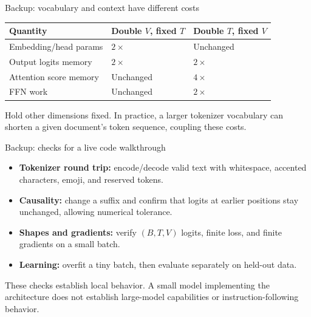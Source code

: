 \documentclass[11pt,aspectratio=169]{beamer}
\begin{document}
\begin{frame}{Backup: vocabulary and context have different costs}
\begin{tabular}{@{}>{\raggedright\arraybackslash}p{}>{\raggedright\arraybackslash}p{}>{\raggedright\arraybackslash}p{}@{}}
\toprule
Quantity & Double $V$, fixed $T$ & Double $T$, fixed $V$\\\midrule
Embedding/head params & $2\times$ & Unchanged\\[3mm]
Output logits memory & $2\times$ & $2\times$\\[3mm]
Attention score memory & Unchanged & $4\times$\\[3mm]
FFN work & Unchanged & $2\times$\\\bottomrule
\end{tabular}\par
\par\vspace{4mm}
Hold other dimensions fixed. In practice, a larger tokenizer vocabulary can shorten a given document's token sequence, coupling these costs.
\end{frame}

\begin{frame}{Backup: checks for a live code walkthrough}
\begin{itemize}
\item \textbf{Tokenizer round trip:} encode/decode valid text with whitespace, accented characters, emoji, and reserved tokens.
\item \textbf{Causality:} change a suffix and confirm that logits at earlier positions stay unchanged, allowing numerical tolerance.
\item \textbf{Shapes and gradients:} verify $(B,T,V)$ logits, finite loss, and finite gradients on a small batch.
\item \textbf{Learning:} overfit a tiny batch, then evaluate separately on held-out data.
\end{itemize}
\par\vspace{4mm}
These checks establish local behavior. A small model implementing the architecture does not establish large-model capabilities or instruction-following behavior.
\end{frame}
\end{document}
